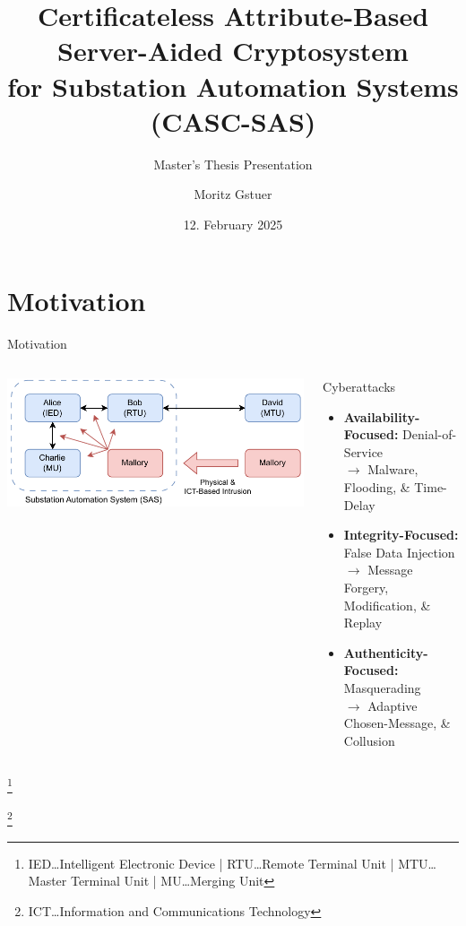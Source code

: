 \documentclass[en]{sdqbeamer}
\title[ABAC for Substations]{Certificateless Attribute-Based Server-Aided Cryptosystem\\for Substation Automation Systems (CASC-SAS)}
\subtitle{Master's Thesis Presentation}
\author[Moritz Gstuer]{Moritz Gstuer}
\date[12.\,02.\,2025]{12. February 2025}
\newcommand\nonumberfootnote[1]{%
  \begingroup
  \renewcommand\thefootnote{}\footnote{#1}%
  \addtocounter{footnote}{-1}%
  \endgroup
}
\begin{document}
 
\KITtitleframe


\section{Motivation}
\begin{frame}{Motivation}
    \begin{columns}
        \centering
        \includegraphics[width=1.0\textwidth]{./figures/sas_intrusion.drawio.pdf}
        \begin{redblock}{Cyberattacks}
            \begin{itemize}
                \item \textbf{Availability-Focused:} Denial-of-Service\\$\rightarrow$ Malware, Flooding, \& Time-Delay
                \item \textbf{Integrity-Focused:} False Data Injection\\$\rightarrow$ Message Forgery, Modification, \& Replay
                \item \textbf{Authenticity-Focused:} Masquerading\\$\rightarrow$ Adaptive Chosen-Message, \& Collusion
            \end{itemize}
        \end{redblock}
    \end{columns}
    \nonumberfootnote{\color{SteelBlue} IED\dots Intelligent Electronic Device \color{black}| \color{SteelBlue} RTU\dots Remote Terminal Unit \color{black}| \color{SteelBlue} MTU\dots Master Terminal Unit \color{black}| \color{SteelBlue} MU\dots Merging Unit}
    \nonumberfootnote{ICT\dots Information and Communications Technology}
\end{frame}
\end{document}
